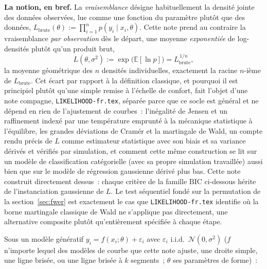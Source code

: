 \documentclass[11pt]{article}
\newcommand{\code}[1]{\texttt{#1}}
\begin{document}
\textbf{La notion, en bref.} La \emph{vraisemblance} désigne
habituellement la densité jointe des données observées, lue comme une
fonction du paramètre plutôt que des données, $L_{\text{brute}}(\theta)
:= \prod_{i=1}^n p(y_i \mid x_i, \theta)$. Cette note prend au contraire
la vraisemblance \emph{par observation} dès le départ, une moyenne
\emph{exponentiée} de log-densités plutôt qu'un produit brut,
$$L(\theta,\sigma^2) := \exp\!\big(\mathbb E[\ln p]\big) = L_{\text{brute}}^{\,1/n},$$
la moyenne géométrique des $n$ densités individuelles, exactement la
racine $n$-ième de $L_{\text{brute}}$. Cet écart par rapport à la
définition classique, et pourquoi il est principiel plutôt qu'une
simple remise à l'échelle de confort, fait l'objet d'une note
compagne, \code{LIKELIHOOD-fr.tex}, séparée parce que ce socle est
général et ne dépend en rien de l'ajustement de courbes~: l'inégalité
de Jensen et un raffinement indexé par une température emprunté à la
mécanique statistique à l'équilibre, les grandes déviations de
Cram\'er et la martingale de Wald, un compte rendu précis de $L$
comme estimateur statistique avec son biais et sa variance dérivés et
vérifiés par simulation, et comment cette même construction se lit
sur un modèle de classification catégorielle (avec sa propre
simulation travaillée) aussi bien que sur le modèle de régression
gaussienne dérivé plus bas. Cette note construit directement
dessus~: chaque critère de la famille $\mathrm{BIC}$ ci-dessous hérite
de l'instanciation gaussienne de $L$. Le test séquentiel fondé sur la
permutation de la section~\ref{sec:fwer} est exactement le cas que
\code{LIKELIHOOD-fr.tex} identifie où la borne martingale classique de
Wald ne s'applique pas directement, une alternative composite plutôt
qu'entièrement spécifiée à chaque étape.

Sous un modèle génératif $y_i = f(x_i;\theta) + \varepsilon_i$ avec $\varepsilon_i$
i.i.d.\ $\mathcal N(0,\sigma^2)$ ($f$ n'importe lequel des modèles de
courbe que cette note ajuste, une droite simple, une ligne brisée, ou une
ligne brisée à $k$ segments~; $\theta$ ses paramètres de forme)~:

\begin{center}
\end{center}
\end{document}
